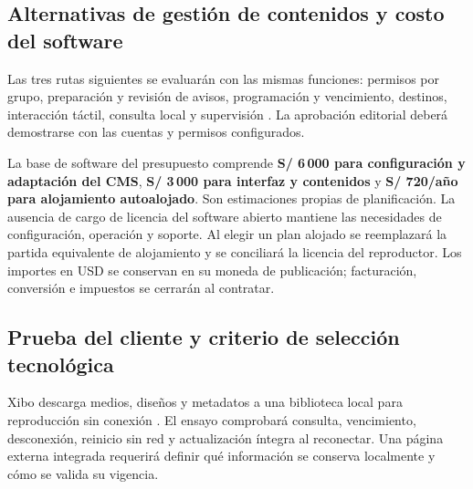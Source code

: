 \subsection{Alternativas de gestión de contenidos y costo del software}
Las tres rutas siguientes se evaluarán con las mismas funciones: permisos por grupo, preparación y revisión de avisos, programación y vencimiento, destinos, interacción táctil, consulta local y supervisión \cite{xibousers,xibotouch,xibodisplays}. La aprobación editorial deberá demostrarse con las cuentas y permisos configurados.


La base de software del presupuesto comprende \textbf{S/ 6\,000 para configuración y adaptación del CMS}, \textbf{S/ 3\,000 para interfaz y contenidos} y \textbf{S/ 720/año para alojamiento autoalojado}. Son estimaciones propias de planificación. La ausencia de cargo de licencia del software abierto mantiene las necesidades de configuración, operación y soporte. Al elegir un plan alojado se reemplazará la partida equivalente de alojamiento y se conciliará la licencia del reproductor. Los importes en USD se conservan en su moneda de publicación; facturación, conversión e impuestos se cerrarán al contratar.

\subsection{Prueba del cliente y criterio de selección tecnológica}
Xibo descarga medios, diseños y metadatos a una biblioteca local para reproducción sin conexión \cite{xibostorage}. El ensayo comprobará consulta, vencimiento, desconexión, reinicio sin red y actualización íntegra al reconectar. Una página externa integrada requerirá definir qué información se conserva localmente y cómo se valida su vigencia.

